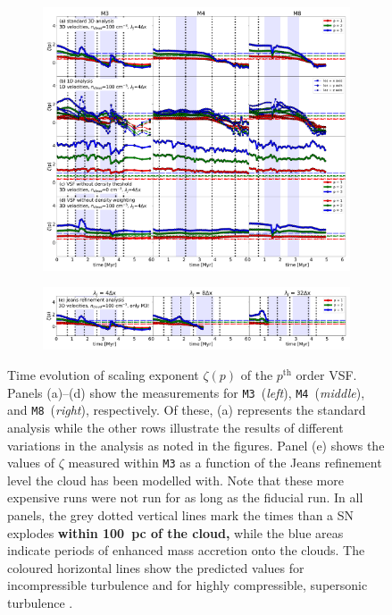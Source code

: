 \begin{figure}[!htb]
	\centering  
  
  \begin{subfigure}[c]{\textwidth}
      \includegraphics[width=\textwidth]{zeta_all_nojeans.pdf}
      \label{pic:results:zeta_all_nojeans}
  \end{subfigure}
  \begin{subfigure}[c]{\textwidth}
      \addtocounter{subfigure}{4}
      \includegraphics[width=\textwidth]{zeta_jeans.pdf}
      \label{pic:results:zeta_all_jeans}
  \end{subfigure}
  
  \caption{Time evolution of scaling exponent $\zeta(p)$ of the $p^\mathrm{th}$ order VSF. Panels (a)--(d) show the measurements for \texttt{M3}~(\textit{left}), \texttt{M4}~(\textit{middle}), and \texttt{M8}~(\textit{right}), respectively. Of these, (a) represents the standard analysis while the other rows illustrate the results of different variations in the analysis as noted in the figures. Panel (e) shows the values of $\zeta$ measured within \texttt{M3} as a function of the Jeans refinement level the cloud has been modelled with. Note that these more expensive runs were not run for as long as the fiducial run.  In all panels, the grey dotted vertical lines mark the times than a SN explodes \textbf{within 100~pc of the cloud,} while the blue areas indicate periods of enhanced mass accretion onto the clouds. The coloured horizontal lines show the predicted values for incompressible turbulence \citep[dash-dotted lines;][]{She1994} and for highly compressible, supersonic turbulence \citep[dashed lines;][]{Boldyrev2002}.
	\label{pic:results:zeta_all}
}
\end{figure}

